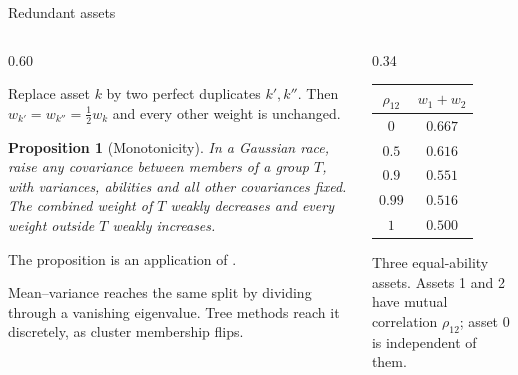 \documentclass[aspectratio=169,11pt]{beamer}
\newtheorem{proposition}[theorem]{Proposition}
\begin{document}
\begin{frame}{Redundant assets}
\begin{columns}[T,onlytextwidth]
\begin{column}{0.60\textwidth}\setlength{\parskip}{0.5em}
\begin{lemma}[Redundancy]
Replace asset $k$ by two perfect duplicates $k',k''$. Then
$w_{k'}=w_{k''}=\tfrac12 w_k$ and every other weight is unchanged.
\end{lemma}

\begin{proposition}[Monotonicity]
In a Gaussian race, raise any covariance between members of a group $T$, with
variances, abilities and all other covariances fixed. The combined weight of
$T$ weakly decreases and every weight outside $T$ weakly increases.
\end{proposition}

The proposition is an application of \textcite{slepian1962}.

Mean--variance reaches the same split by dividing through a vanishing
eigenvalue. Tree methods reach it discretely, as cluster membership flips.
\end{column}
\begin{column}{0.34\textwidth}
\centering\small
\begin{tabular}{cc}
  \toprule
  $\rho_{12}$ & $w_1+w_2$ \\
  \midrule
  $0$    & $0.667$ \\
  $0.5$  & $0.616$ \\
  $0.9$  & $0.551$ \\
  $0.99$ & $0.516$ \\
  $1$    & $0.500$ \\
  \bottomrule
\end{tabular}

\medskip
\raggedright\scriptsize
Three equal-ability assets. Assets 1 and 2 have mutual correlation $\rho_{12}$;
asset 0 is independent of them.
\end{column}
\end{columns}
\end{frame}
\end{document}
